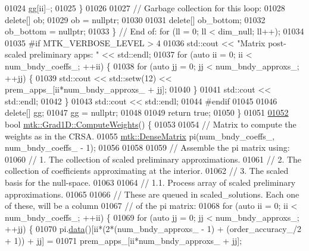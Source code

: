 \begin{DoxyCode}
{{01024       gg[ii]--;
01025     \}
01026 
01027     \textcolor{comment}{// Garbage collection for this loop:}
01028     \textcolor{keyword}{delete}[] ob;
01029     ob = \textcolor{keyword}{nullptr};
01030 
01031     \textcolor{keyword}{delete}[] ob\_bottom;
01032     ob\_bottom = \textcolor{keyword}{nullptr};
01033   \} \textcolor{comment}{// End of: for (ll = 0; ll < dim\_null; ll++);}
01034 
01035 \textcolor{preprocessor}{  #if MTK\_VERBOSE\_LEVEL > 4}
01036   std::cout << \textcolor{stringliteral}{"Matrix post-scaled preliminary apps: "} << std::endl;
01037   \textcolor{keywordflow}{for} (\textcolor{keyword}{auto} ii = 0; ii < num\_bndy\_coeffs\_; ++ii) \{
01038     \textcolor{keywordflow}{for} (\textcolor{keyword}{auto} jj = 0; jj < num\_bndy\_approxs\_; ++jj) \{
01039       std::cout << std::setw(12) << prem\_apps\_[ii*num\_bndy\_approxs\_ + jj];
01040     \}
01041     std::cout << std::endl;
01042   \}
01043   std::cout << std::endl;
01044 \textcolor{preprocessor}{  #endif}
01045 
01046   \textcolor{keyword}{delete}[] gg;
01047   gg = \textcolor{keyword}{nullptr};
01048 
01049   \textcolor{keywordflow}{return} \textcolor{keyword}{true};
01050 \}
01051 
\hypertarget{mtk__grad__1d_8cc_source_l01052}{}\hyperlink{classmtk_1_1Grad1D_a224082617751864bffca9bfe494c36d5}{01052} \textcolor{keywordtype}{bool} \hyperlink{classmtk_1_1Grad1D_a224082617751864bffca9bfe494c36d5}{mtk::Grad1D::ComputeWeights}() \{
01053 
01054   \textcolor{comment}{// Matrix to compute the weights as in the CRSA.}
01055   \hyperlink{classmtk_1_1DenseMatrix}{mtk::DenseMatrix} pi(num\_bndy\_coeffs\_, num\_bndy\_coeffs\_ - 1);
01056 
01058 
01059   \textcolor{comment}{// Assemble the pi matrix using:}
01060   \textcolor{comment}{// 1. The collection of scaled preliminary approximations.}
01061   \textcolor{comment}{// 2. The collection of coefficients approximating at the interior.}
01062   \textcolor{comment}{// 3. The scaled basis for the null-space.}
01063 
01064   \textcolor{comment}{// 1.1. Process array of scaled preliminary approximations.}
01065 
01066   \textcolor{comment}{// These are queued in scaled\_solutions. Each one of these, will be a column}
01067   \textcolor{comment}{// of the pi matrix:}
01068   \textcolor{keywordflow}{for} (\textcolor{keyword}{auto} ii = 0; ii < num\_bndy\_coeffs\_; ++ii) \{
01069     \textcolor{keywordflow}{for} (\textcolor{keyword}{auto} jj = 0; jj < num\_bndy\_approxs\_; ++jj) \{
01070       pi.\hyperlink{classmtk_1_1DenseMatrix_a0c33b8a9e01d157c61ddbdf807c25d84}{data}()[ii*(2*(num\_bndy\_approxs\_ - 1) + (order\_accuracy\_/2 + 1)) + jj] =
01071         prem\_apps\_[ii*num\_bndy\_approxs\_ + jj];
}}
\end{DoxyCode}

